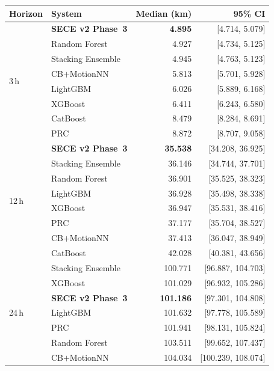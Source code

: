 \documentclass{ametsocv6.1}
\newcommand{\sece}{SECE}
\begin{document}
\begin{table}[ht]
\centering
\footnotesize
\begin{tabular}{@{}llrr@{}}
\toprule
Horizon & System & Median (km) & 95\% CI \\
\midrule
\multirow{8}{*}{3\,h}
 & \textbf{\sece{} v2 Phase~3} & \textbf{4.895} & [4.714, 5.079] \\
 & Random Forest               & 4.927 & [4.734, 5.125] \\
 & Stacking Ensemble           & 4.945 & [4.763, 5.123] \\
 & CB$+$MotionNN               & 5.813 & [5.701, 5.928] \\
 & LightGBM                    & 6.026 & [5.889, 6.168] \\
 & XGBoost                     & 6.411 & [6.243, 6.580] \\
 & CatBoost                    & 8.479 & [8.284, 8.691] \\
 & PRC                         & 8.872 & [8.707, 9.058] \\
\midrule
\multirow{8}{*}{12\,h}
 & \textbf{\sece{} v2 Phase~3} & \textbf{35.538} & [34.208, 36.925] \\
 & Stacking Ensemble           & 36.146 & [34.744, 37.701] \\
 & Random Forest               & 36.901 & [35.525, 38.323] \\
 & LightGBM                    & 36.928 & [35.498, 38.338] \\
 & XGBoost                     & 36.947 & [35.531, 38.416] \\
 & PRC                         & 37.177 & [35.704, 38.527] \\
 & CB$+$MotionNN               & 37.413 & [36.047, 38.949] \\
 & CatBoost                    & 42.028 & [40.381, 43.656] \\
\midrule
\multirow{8}{*}{24\,h}
 & Stacking Ensemble           & 100.771 & [96.887, 104.703] \\
 & XGBoost                     & 101.029 & [96.932, 105.286] \\
 & \textbf{\sece{} v2 Phase~3} & \textbf{101.186} & [97.301, 104.808] \\
 & LightGBM                    & 101.632 & [97.778, 105.589] \\
 & PRC                         & 101.941 & [98.131, 105.824] \\
 & Random Forest               & 103.511 & [99.652, 107.437] \\
 & CB$+$MotionNN               & 104.034 & [100.239, 108.074] \\

\end{tabular}
\end{table}
\end{document}
